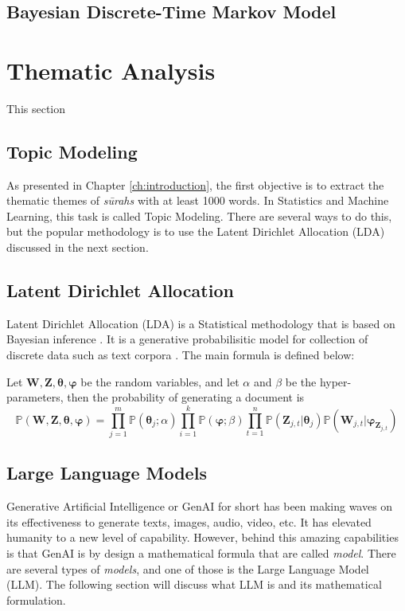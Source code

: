 \subsection{Bayesian Discrete-Time Markov Model}
\section{Thematic Analysis}
This section 
\subsection{Topic Modeling}\label{sec:topic_modeling_method}
As presented in Chapter \ref{ch:introduction}, the first objective is to extract the thematic themes of \textit{s\=urahs}  with at least 1000 words. In Statistics and Machine Learning, this task is called Topic Modeling. There are several ways to do this, but the popular methodology is to use the Latent Dirichlet Allocation (LDA) discussed in the next section.
\subsection{Latent Dirichlet Allocation}\label{sec:lda}
Latent Dirichlet Allocation (LDA) is a Statistical methodology that is based on Bayesian inference \cite{bayes,laplace1986}. It is a generative probabilisitic model for collection of discrete data such as text corpora \cite{blei2003latent}. The main formula is defined below:
\begin{defnx}
Let $\mathbf{W},\mathbf{Z},\boldsymbol{\theta},\boldsymbol{\varphi}$ be the random variables, and let $\alpha$ and $\beta$ be the hyper-parameters, then the probability of generating a document is
\begin{equation}
    \mathbb{P}(\mathbf{W},\mathbf{Z},\boldsymbol{\theta},\boldsymbol{\varphi})=\prod_{j=1}^m\mathbb{P}(\boldsymbol{\theta}_j;\alpha)\prod_{i=1}^{k}\mathbb{P}(\boldsymbol{\varphi};\beta)\prod_{t=1}^{n}\mathbb{P}(\mathbf{Z}_{j,t}|\boldsymbol{\theta}_j)\mathbb{P}(\mathbf{W}_{j,t}|\boldsymbol{\varphi}_{\mathbf{Z}_{j,t}})
\end{equation}
\end{defnx}
\subsection{Large Language Models}\label{sec:llm_method}
Generative Artificial Intelligence or GenAI for short has been making waves on its effectiveness to generate texts, images, audio, video, etc. It has elevated humanity to a new level of capability. However, behind this amazing capabilities is that GenAI is by design a mathematical formula that are called \textit{model}. There are several types of \textit{models}, and one of those is the Large Language Model (LLM). The following section will discuss what LLM is and its mathematical formulation.
